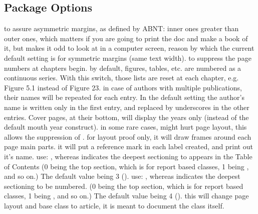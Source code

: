 \documentclass[dctools,english,tocdepth=3,secdepth=3]{ufrgscca} %
\begin{document}
\subsection{Package Options}
\begin{Options}
	 to assure asymmetric margins, as defined by ABNT: inner ones greater than outer ones, which matters if you are going to print the doc and make a book of it, but makes it odd to look at in a computer screen, reason by which the current default setting is for symmetric margins (same text width).
	 to suppress the page numbers at chapters begin.
	 by default, figures, tables, etc. are numbered as a continuous series. With this switch, those lists are reset at each chapter, e.g. Figure 5.1 instead of Figure 23.
	 in case of authors with multiple publications, their names will be repeated for each entry. In the default setting the author's name is written only in the first entry, and replaced by underscores in the other entries.
     Cover pages, at their bottom, will display the years only (instead of the default mouth year construct).
	 in some rare cases,  might hurt page layout, this allows the suppression of .
	 for layout proof only, it will draw frames around each page main parts.
	 it will put a reference mark in each label created, and print out it's name.
	 use: , whereas  indicates the deepest sectioning to appears in the Table of Contents (0 being the top section, which is \Macro{\chapter}{} for report based classes, 1 being \Macro{\section}{}, and so on.) The default value being 3 (\Macro{\subsubsection}{}).
	 use: , whereas  indicates the deepest sectioning to be numbered. (0 being the top section, which is \Macro{\chapter}{} for report based classes, 1 being \Macro{\section}{}, and so on.) The default value being 4 (\Macro{\paragraph}{}).
	  this will change page layout and base class to article, it is meant to document the class itself.
\end{Options}
\end{document}
